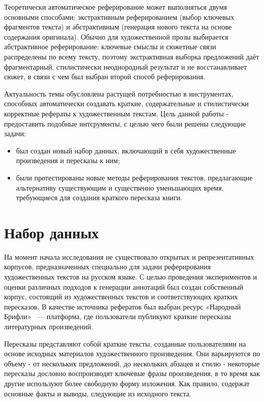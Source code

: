 \documentclass{article}
\begin{document}
Теоретически автоматическое реферирование может выполняться двумя основными способами: экстрактивным реферированием (выбор ключевых фрагментов текста) и абстрактивным (генерация нового текста на основе содержания оригинала). 
Обычно для художественной прозы выбирается абстрактивное реферирование: 
ключевые смыслы и сюжетные связи распределены по всему тексту, поэтому экстрактивная выборка предложений даёт фрагментарный, 
стилистически неоднородный результат и не восстанавливает сюжет, в связи с чем был выбран второй способ реферирования.

Актуальность темы обусловлена растущей потребностью в инструментах, способных
автоматически создавать краткие, содержательные и стилистически корректные рефераты к художественным текстам.
Цель данной работы - предоставить подобные интсрументы, с целью чего были решены следующие задачи:
\begin{itemize}
  \item был создан новый набор данных, включающий в себя художественные произведения и пересказы к ним;
  \item были протестированы новые методы реферирования текстов, предлагающие альтернативу существующим и существенно уменьшающих время, требующиеся для создания краткого пересказа книги.
\end{itemize}


\section*{Набор данных}
На момент начала исследования не существовало открытых и репрезентативных корпусов, предназначенных специально для задачи реферирования художественных текстов на русском языке. С целью проведения экспериментов и оценки различных подходов к генерации аннотаций был создан собственный корпус, состоящий из художественных текстов и соответствующих кратких пересказов. 
В качестве источника рефератов был выбран ресурс «Народный Брифли»~\cite{Briefly} — платформа, где пользователи публикуют краткие пересказы литературных произведений. 

Пересказы представляют собой краткие тексты, созданные пользователями на основе исходных материалов художественного произведения. Они варьируются по объему - от нескольких предложений,
до нескольких абзацев и стилю - некоторые пересказы дословно воспроизводят ключевые фразы произведения, в то время как другие используют более свободную форму изложения. 
Как правило, содержат основные факты и выводы, следующие из исходного текста.
\end{document}
